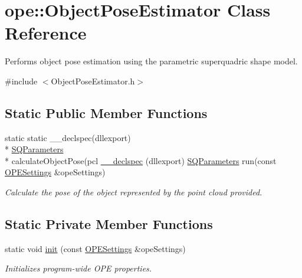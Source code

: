 \hypertarget{classope_1_1_object_pose_estimator}{\section{ope\-:\-:Object\-Pose\-Estimator Class Reference}
\label{classope_1_1_object_pose_estimator}
}


Performs object pose estimation using the parametric superquadric shape model.  




{\ttfamily \#include $<$Object\-Pose\-Estimator.\-h$>$}

\subsection*{Static Public Member Functions}
\begin{DoxyCompactItemize}
\item 
static static \-\_\-\-\_\-declspec(dllexport) \\*
\hyperlink{classope_1_1_s_q_parameters}{S\-Q\-Parameters} \\*
calculate\-Object\-Pose(pcl \hyperlink{classope_1_1_object_pose_estimator_af12090f3ce26fbe6371d3b7bb845623d}{\-\_\-\-\_\-declspec} (dllexport) \hyperlink{classope_1_1_s_q_parameters}{S\-Q\-Parameters} run(const \hyperlink{classope_1_1_o_p_e_settings}{O\-P\-E\-Settings} \&ope\-Settings)
\begin{DoxyCompactList}\small\item\em Calculate the pose of the object represented by the point cloud provided. \end{DoxyCompactList}\end{DoxyCompactItemize}
\subsection*{Static Private Member Functions}
\begin{DoxyCompactItemize}
\item 
\hypertarget{classope_1_1_object_pose_estimator_a96ea1a4a493868c7fffb200050635228}{static void \hyperlink{classope_1_1_object_pose_estimator_a96ea1a4a493868c7fffb200050635228}{init} (const \hyperlink{classope_1_1_o_p_e_settings}{O\-P\-E\-Settings} \&ope\-Settings)}\label{classope_1_1_object_pose_estimator_a96ea1a4a493868c7fffb200050635228}

\begin{DoxyCompactList}\small\item\em Initializes program-\/wide O\-P\-E properties. \end{DoxyCompactList}\end{DoxyCompactItemize}


